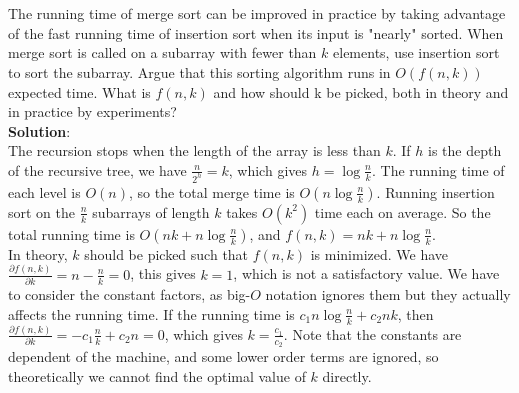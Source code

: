\documentclass[UTF8]{ctexart}
\begin{document}
\section{}
The running time of merge sort can be improved in practice by taking advantage of the fast 
running time of insertion sort when its input is "nearly" sorted. When merge sort is called on a 
subarray with fewer than $k$ elements, use insertion sort to sort the subarray. Argue that this sorting 
algorithm runs in $O(f(n, k))$ expected time. What is $f(n, k)$ and how should k be picked, both in 
theory and in practice by experiments?\\

\textbf{Solution}:\\
The recursion stops when the length of the array is less than $k$. If $h$ is the depth of the recursive tree, we have $\frac{n}{2^h} = k$, which gives $h = \log \frac{n}{k}$. 
The running time of each level is $O(n)$, so the total merge time is $O(n \log \frac{n}{k})$. 
Running insertion sort on the $\frac{n}{k}$ subarrays of length $k$ takes $O(k^2)$ time each on average. So the total running time is $O(nk + n \log \frac{n}{k})$, and $f(n,k) = nk + n \log \frac{n}{k}$.\\

In theory, $k$ should be picked such that $f(n,k)$ is minimized. We have $\frac{\partial f(n,k)}{\partial k} = n - \frac{n}{k} = 0$, this gives $k = 1$, which is not a satisfactory value.
We have to consider the constant factors, as big-$O$ notation ignores them but they actually affects the running time. If the running time is $c_1 n \log \frac{n}{k} + c_2 nk$, then $\frac{\partial f(n,k)}{\partial k} = - c_1 \frac{n}{k} + c_2 n = 0$, which gives $k = \frac{c_1}{c_2}$.
Note that the constants are dependent of the machine, and some lower order terms are ignored, so theoretically we cannot find the optimal value of $k$ directly.\\
\end{document}
